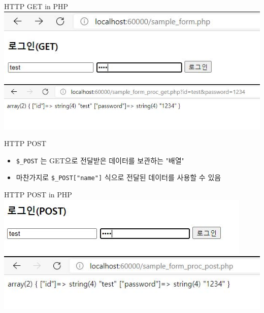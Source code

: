 \documentclass{beamer}
\begin{document}
    \begin{frame}{HTTP GET in PHP}
        \includegraphics[width=\linewidth]{Images/login_form_get.JPG}
        \vspace{0.8cm}
        \includegraphics[width=\linewidth]{Images/login_form_get_result.JPG}
    \end{frame}

    \begin{frame}{HTTP POST}
        \begin{itemize}
            \item \texttt{\$\_POST} 는 GET으로 전달받은 데이터를 보관하는 "배열"
            \item 마찬가지로 \texttt{\$\_POST["name"]} 식으로 전달된 데이터를 사용할 수 있음
        \end{itemize}
    \end{frame}

    \begin{frame}{HTTP POST in PHP}
        \includegraphics[width=\linewidth]{Images/login_form_post.JPG}
        \vspace{0.8cm}
        \includegraphics[width=\linewidth]{Images/login_form_post_result.JPG}
    \end{frame}
\end{document}

